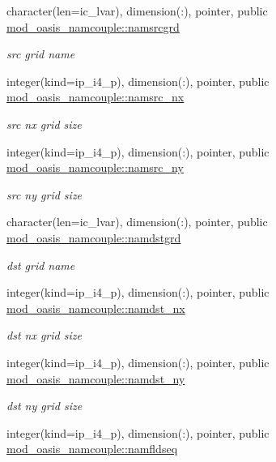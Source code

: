 \begin{DoxyCompactItemize}
character(len=ic\+\_\+lvar), dimension(\+:), pointer, public \hyperlink{namespacemod__oasis__namcouple_a589c1bae58b10bcb0cfb30c0893a7895}{mod\+\_\+oasis\+\_\+namcouple\+::namsrcgrd}
\begin{DoxyCompactList}\small\item\em src grid name \end{DoxyCompactList}\item 
integer(kind=ip\+\_\+i4\+\_\+p), dimension(\+:), pointer, public \hyperlink{namespacemod__oasis__namcouple_ac8f6c8fe3720739f3d26431a8a600506}{mod\+\_\+oasis\+\_\+namcouple\+::namsrc\+\_\+nx}
\begin{DoxyCompactList}\small\item\em src nx grid size \end{DoxyCompactList}\item 
integer(kind=ip\+\_\+i4\+\_\+p), dimension(\+:), pointer, public \hyperlink{namespacemod__oasis__namcouple_ab82c80f007b37865172ddb033a1abb36}{mod\+\_\+oasis\+\_\+namcouple\+::namsrc\+\_\+ny}
\begin{DoxyCompactList}\small\item\em src ny grid size \end{DoxyCompactList}\item 
character(len=ic\+\_\+lvar), dimension(\+:), pointer, public \hyperlink{namespacemod__oasis__namcouple_a7a2ed64b0670db38d2287f5d452060e4}{mod\+\_\+oasis\+\_\+namcouple\+::namdstgrd}
\begin{DoxyCompactList}\small\item\em dst grid name \end{DoxyCompactList}\item 
integer(kind=ip\+\_\+i4\+\_\+p), dimension(\+:), pointer, public \hyperlink{namespacemod__oasis__namcouple_a6add94418eefdaefd78cd971888a5826}{mod\+\_\+oasis\+\_\+namcouple\+::namdst\+\_\+nx}
\begin{DoxyCompactList}\small\item\em dst nx grid size \end{DoxyCompactList}\item 
integer(kind=ip\+\_\+i4\+\_\+p), dimension(\+:), pointer, public \hyperlink{namespacemod__oasis__namcouple_a9035fc89396bad9574c88642d3aac5f0}{mod\+\_\+oasis\+\_\+namcouple\+::namdst\+\_\+ny}
\begin{DoxyCompactList}\small\item\em dst ny grid size \end{DoxyCompactList}\item 
integer(kind=ip\+\_\+i4\+\_\+p), dimension(\+:), pointer, public \hyperlink{namespacemod__oasis__namcouple_a54ccfe0380fc1c89d085f37a044a297e}{mod\+\_\+oasis\+\_\+namcouple\+::namfldseq}

\end{DoxyCompactItemize}
